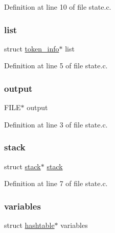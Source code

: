 Definition at line 10 of file state.\+c.

\mbox{\label{structstate_ae1283cface726b16d3b16bbbf0a702ee}} 
\subsubsection{\texorpdfstring{list}{list}}
{\footnotesize\ttfamily struct \mbox{\hyperlink{structtoken__info}{token\+\_\+info}}$\ast$ list}



Definition at line 5 of file state.\+c.

\mbox{\label{structstate_ab41bf19330e50c3c7bf3544c53f30971}} 
\subsubsection{\texorpdfstring{output}{output}}
{\footnotesize\ttfamily F\+I\+LE$\ast$ output}



Definition at line 3 of file state.\+c.

\mbox{\label{structstate_a3fdd23f2fd4b006bb7e38f0b39956c44}} 
\subsubsection{\texorpdfstring{stack}{stack}}
{\footnotesize\ttfamily struct \mbox{\hyperlink{structstack}{stack}}$\ast$ \mbox{\hyperlink{structstack}{stack}}}



Definition at line 7 of file state.\+c.

\mbox{\label{structstate_a7e36c2490492a4c09cbe8a6ef51c5a95}} 
\subsubsection{\texorpdfstring{variables}{variables}}
{\footnotesize\ttfamily struct \mbox{\hyperlink{structhashtable}{hashtable}}$\ast$ variables}



